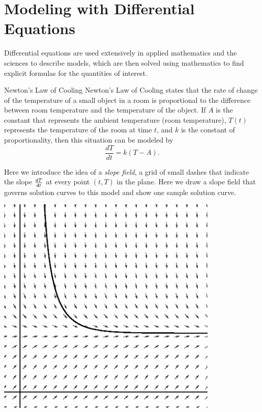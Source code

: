 \section{Modeling with Differential Equations}  Differential equations are used extensively in applied mathematics and the sciences to describe models, which are then solved using mathematics to find explicit formulas for the quantities of interest.

\begin{example}{Newton's Law of Cooling}
Newton's Law of Cooling states that the rate of change of the temperature of a small object in a room is proportional to the difference between room temperature and the temperature of the object.  If $A$ is the constant that represents the ambient temperature (room temperature), $T(t)$ represents the temperature of the room at time $t$, and $k$ is the constant of proportionality, then this situation can be modeled by $$ \frac{dT}{dt}=k(T-A).$$

Here we introduce the idea of a \emph{slope field}, a grid of small dashes that indicate the slope $\frac{\mathop{}\!\mathtt{d} T}{\mathop{}\!\mathtt{d} t}$ at every point $(t,T)$ in the plane.  Here we draw a slope field that governs solution curves to this model and show one sample solution curve.

\begin{center}
	\includegraphics[width=300pt]{ChapterDiffEq/Figures/slopeyfield.eps}
\end{center}

\end{example}

